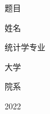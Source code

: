 \thispagestyle{empty} %

\begin{center}

{\LARGE \centering
\begin{doublespace}
	题目
\end{doublespace}
}

\Large
\vspace{15ex}
姓名

\vspace{10ex}
统计学专业

\vspace{10ex}
大学

院系

\vspace{10ex}

2022
\end{center}